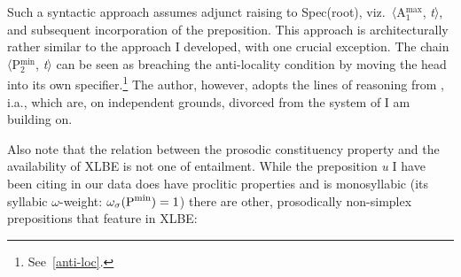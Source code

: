 \documentclass[output=paper]{langsci/langscibook}
\begin{document}
\begin{exe}
	\ex\label{tal3}
\end{exe}

Such a syntactic approach assumes adjunct raising to Spec(root), viz.\
〈A$^\text{{max}}_{1}$, \emph{t}〉, and subsequent incorporation of
the preposition. This approach is architecturally rather similar to the
approach I developed, with one crucial exception. The chain
〈P$^{\text{min}}_{2}$, \emph{t}〉 can be seen as breaching the
anti-locality condition by moving the head into its own
specifier.\footnote{See~\cref{anti-loc}.} The author, however, adopts the lines
of reasoning from \citet{Matushansky:2006}, i.a., which are, on independent
grounds, divorced from the system of \citet{Roberts2010,roberts:2012uq} I am
building on.

Also note that the relation between the prosodic constituency property and the
availability of XLBE is not one of entailment. While the preposition \emph{u} I
have been citing in our data does have proclitic properties and is monosyllabic
(its syllabic $\omega$-weight: $\omega_\sigma(\textup{P}^{\text{min}})=1$)
there are other, prosodically non-simplex prepositions that feature in XLBE:\pagebreak
\end{document}
